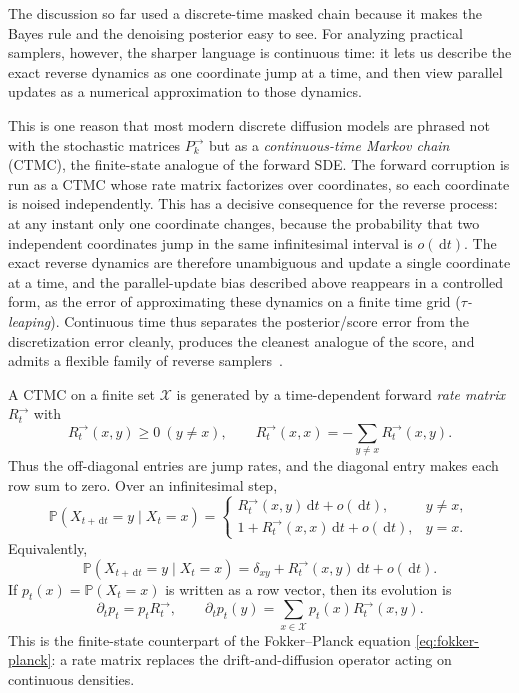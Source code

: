 \documentclass{amsart}
\numberwithin{equation}{section}
\theoremstyle{plain}
\theoremstyle{definition}
\theoremstyle{remark}
\newcommand{\Pp}{\mathbb{P}}
\newcommand{\dd}{\,\mathrm{d}}
\newcommand{\cX}{\mathcal{X}}
\begin{document}
The discussion so far used a discrete-time masked chain because it makes the
Bayes rule and the denoising posterior easy to see.  For analyzing practical
samplers, however, the sharper language is continuous time: it lets us describe
the exact reverse dynamics as one coordinate jump at a time, and then view
parallel updates as a numerical approximation to those dynamics.

This is one reason that most modern discrete diffusion models are phrased not with
the stochastic matrices $P_k^{\to}$ but as a \emph{continuous-time Markov chain}
(CTMC), the finite-state analogue of the forward SDE\@.  The forward corruption is
run as a CTMC whose rate matrix factorizes over coordinates, so each coordinate
is noised independently.  This has a decisive consequence for the reverse
process: at any instant only one coordinate changes, because the probability
that two independent coordinates jump in the same infinitesimal interval is
$o(\dd t)$.  The exact reverse dynamics are therefore unambiguous and update a single
coordinate at a time, and the parallel-update bias described above
reappears in a controlled form, as the error of approximating these dynamics on
a finite time grid (\emph{$\tau$-leaping}).  Continuous time thus separates the
posterior/score error from the discretization error cleanly, produces the
cleanest analogue of the score, and admits a flexible family of reverse
samplers~\cite{campbell2022continuous,lou2024sedd}.

A CTMC on a finite set $\cX$ is generated by a time-dependent forward
\emph{rate matrix} $R_t^{\to}$ with
\[
    R_t^{\to}(x,y)\geq0\ (y\neq x),
    \qquad
    R_t^{\to}(x,x)=-\sum_{y\neq x}R_t^{\to}(x,y).
\]
Thus the off-diagonal entries are jump rates, and the diagonal entry makes each
row sum to zero.  Over an infinitesimal step,
\[
    \Pp(X_{t+\dd t}=y\mid X_t=x)
    =
    \begin{cases}
    R_t^{\to}(x,y)\dd t+o(\dd t), & y\neq x,\\
    1+R_t^{\to}(x,x)\dd t+o(\dd t), & y=x.
    \end{cases}
\]
Equivalently,
\[
    \Pp(X_{t+\dd t}=y\mid X_t=x)
    =
    \delta_{xy}+R_t^{\to}(x,y)\dd t+o(\dd t).
\]
If $p_t(x)=\Pp(X_t=x)$ is written as a row vector, then its evolution is
\begin{equation}\label{eq:ctmc-forward-equation}
    \partial_t p_t=p_tR_t^{\to},
    \qquad
    \partial_t p_t(y)=\sum_{x\in\cX}p_t(x)R_t^{\to}(x,y).
\end{equation}
This is the finite-state counterpart of the Fokker--Planck equation
\eqref{eq:fokker-planck}: a rate matrix replaces the drift-and-diffusion
operator acting on continuous densities.
\end{document}
